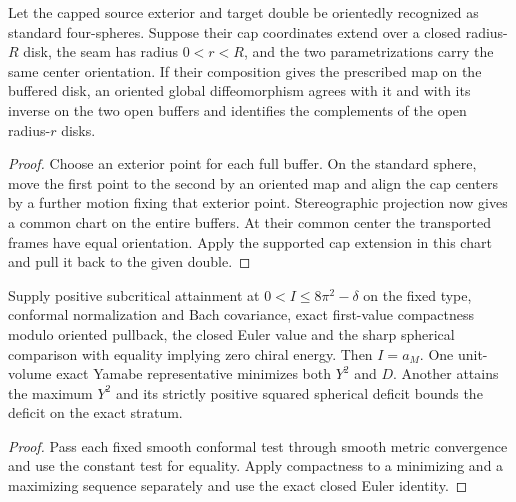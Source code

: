 \begin{proposition}
\label{prop:ed49-exterior}
\leanok
Let the capped source exterior and target double be orientedly recognized
as standard four-spheres. Suppose their cap coordinates extend over a closed
radius-$R$ disk, the seam has radius $0<r<R$, and the two parametrizations
carry the same center orientation. If their composition gives the prescribed
map on the buffered disk, an oriented global diffeomorphism agrees with it
and with its inverse on the two open buffers and identifies the complements
of the open radius-$r$ disks.
\end{proposition}
\begin{proof}
\leanok
Choose an exterior point for each full buffer. On the standard sphere,
move the first point to the second by an oriented map and align the cap
centers by a further motion fixing that exterior point. Stereographic
projection now gives a common chart on the entire buffers. At their common
center the transported frames have equal orientation. Apply the supported
cap extension in this chart and pull it back to the given double.
\end{proof}

\begin{proposition}
\label{prop:ed49-selector}
\leanok
Supply positive subcritical attainment at $0<I\le8\pi^2-\delta$ on the
fixed type, conformal normalization and Bach covariance, exact first-value
compactness modulo oriented pullback, the closed Euler value and the sharp
spherical comparison with equality implying zero chiral energy.
Then $I=a_M$. One unit-volume exact Yamabe representative minimizes
both $Y^2$ and $D$. Another attains the maximum $Y^2$ and its strictly
positive squared spherical deficit bounds the deficit on the exact stratum.
\end{proposition}
\begin{proof}
\leanok
Pass each fixed smooth conformal test through smooth metric convergence and
use the constant test for equality. Apply compactness to a minimizing
and a maximizing sequence separately and use the exact closed Euler identity.
\end{proof}


